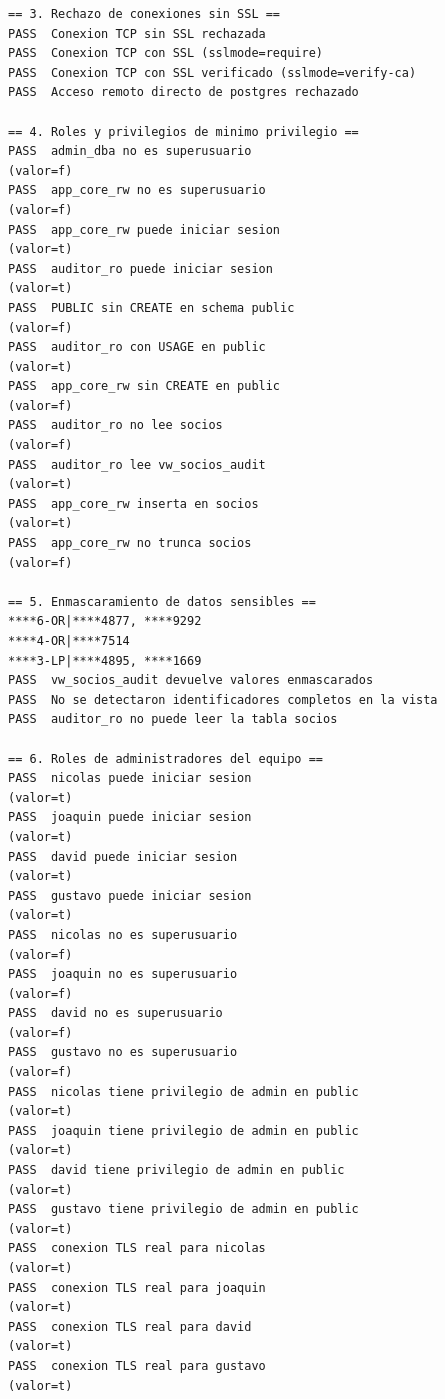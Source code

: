 \begin{lstlisting}[style=terminal,caption={Evidencias reales de hardening (extracto)},label={lst:evidencia-hardening}]
== 3. Rechazo de conexiones sin SSL ==
PASS  Conexion TCP sin SSL rechazada
PASS  Conexion TCP con SSL (sslmode=require)
PASS  Conexion TCP con SSL verificado (sslmode=verify-ca)
PASS  Acceso remoto directo de postgres rechazado

== 4. Roles y privilegios de minimo privilegio ==
PASS  admin_dba no es superusuario                               (valor=f)
PASS  app_core_rw no es superusuario                             (valor=f)
PASS  app_core_rw puede iniciar sesion                           (valor=t)
PASS  auditor_ro puede iniciar sesion                            (valor=t)
PASS  PUBLIC sin CREATE en schema public                         (valor=f)
PASS  auditor_ro con USAGE en public                             (valor=t)
PASS  app_core_rw sin CREATE en public                           (valor=f)
PASS  auditor_ro no lee socios                                   (valor=f)
PASS  auditor_ro lee vw_socios_audit                             (valor=t)
PASS  app_core_rw inserta en socios                              (valor=t)
PASS  app_core_rw no trunca socios                               (valor=f)

== 5. Enmascaramiento de datos sensibles ==
****6-OR|****4877, ****9292
****4-OR|****7514
****3-LP|****4895, ****1669
PASS  vw_socios_audit devuelve valores enmascarados
PASS  No se detectaron identificadores completos en la vista
PASS  auditor_ro no puede leer la tabla socios

== 6. Roles de administradores del equipo ==
PASS  nicolas puede iniciar sesion                                 (valor=t)
PASS  joaquin puede iniciar sesion                                 (valor=t)
PASS  david puede iniciar sesion                                   (valor=t)
PASS  gustavo puede iniciar sesion                                 (valor=t)
PASS  nicolas no es superusuario                                   (valor=f)
PASS  joaquin no es superusuario                                   (valor=f)
PASS  david no es superusuario                                     (valor=f)
PASS  gustavo no es superusuario                                   (valor=f)
PASS  nicolas tiene privilegio de admin en public                  (valor=t)
PASS  joaquin tiene privilegio de admin en public                  (valor=t)
PASS  david tiene privilegio de admin en public                    (valor=t)
PASS  gustavo tiene privilegio de admin en public                  (valor=t)
PASS  conexion TLS real para nicolas                               (valor=t)
PASS  conexion TLS real para joaquin                               (valor=t)
PASS  conexion TLS real para david                                 (valor=t)
PASS  conexion TLS real para gustavo                               (valor=t)


\end{lstlisting}
